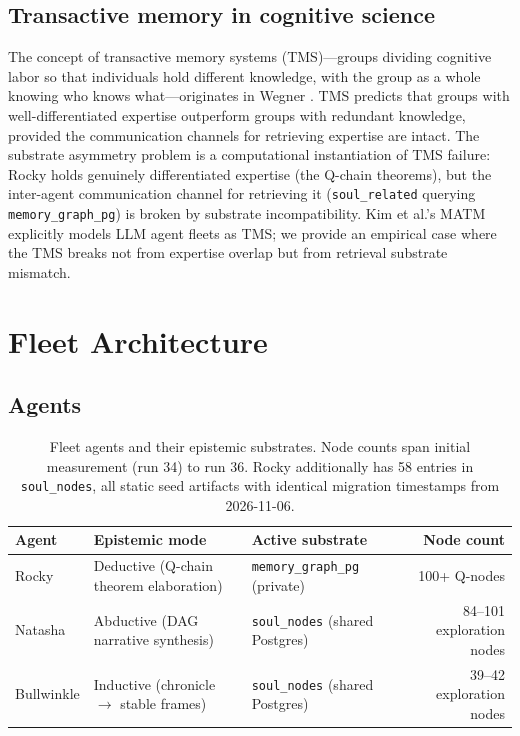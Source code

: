 \documentclass[11pt]{article}
\begin{document}
\subsection{Transactive memory in cognitive science}

The concept of transactive memory systems (TMS)---groups dividing cognitive labor
so that individuals hold different knowledge, with the group as a whole knowing
who knows what---originates in Wegner \citep{wegner1987transactive}.
TMS predicts that groups with well-differentiated expertise outperform groups
with redundant knowledge, provided the communication channels for retrieving
expertise are intact. The substrate asymmetry problem is a computational
instantiation of TMS failure: Rocky holds genuinely differentiated expertise
(the Q-chain theorems), but the inter-agent communication channel for retrieving
it (\texttt{soul\_related} querying \texttt{memory\_graph\_pg}) is broken by
substrate incompatibility. Kim et al.'s MATM \citep{kim2026matm} explicitly models
LLM agent fleets as TMS; we provide an empirical case where the TMS breaks not from
expertise overlap but from retrieval substrate mismatch.

\section{Fleet Architecture}

\subsection{Agents}

\begin{table}[h]
\centering
\begin{tabular}{lllr}
\toprule
Agent & Epistemic mode & Active substrate & Node count \\
\midrule
Rocky & Deductive (Q-chain theorem elaboration) & \texttt{memory\_graph\_pg} (private) & 100+ Q-nodes \\
Natasha & Abductive (DAG narrative synthesis) & \texttt{soul\_nodes} (shared Postgres) & 84--101 exploration nodes \\
Bullwinkle & Inductive (chronicle $\to$ stable frames) & \texttt{soul\_nodes} (shared Postgres) & 39--42 exploration nodes \\
\bottomrule
\end{tabular}
\caption{Fleet agents and their epistemic substrates. Node counts span initial measurement (run 34) to run 36. Rocky additionally has 58 entries in \texttt{soul\_nodes}, all static seed artifacts with identical migration timestamps from 2026-11-06.}
\end{table}
\end{document}
